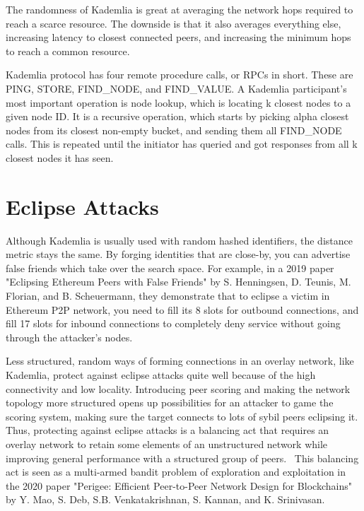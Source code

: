 The randomness of Kademlia is great at averaging the network hops required to reach a scarce resource. The downside is that it also averages everything else, increasing latency to closest connected peers, and increasing the minimum hops to reach a common resource.

Kademlia protocol has four remote procedure calls, or RPCs in short. These are PING, STORE, FIND\_NODE, and FIND\_VALUE. A Kademlia participant's most important operation is node lookup, which is locating k closest nodes to a given node ID. It is a recursive operation, which starts by picking alpha closest nodes from its closest non-empty bucket, and sending them all FIND\_NODE calls. This is repeated until the initiator has queried and got responses from all k closest nodes it has seen.

\section{Eclipse Attacks}
Although Kademlia is usually used with random hashed identifiers, the distance metric stays the same. By forging identities that are close-by, you can advertise false friends which take over the search space. For example, in a 2019 paper "Eclipsing Ethereum Peers with False Friends" by S. Henningsen, D. Teunis, M. Florian, and B. Scheuermann, they demonstrate that to eclipse a victim in Ethereum P2P network, you need to fill its 8 slots for outbound connections, and fill 17 slots for inbound connections to completely deny service without going through the attacker's nodes.~\cite{Henningsen2019-mf}

Less structured, random ways of forming connections in an overlay network, like Kademlia, protect against eclipse attacks quite well because of the high connectivity and low locality. Introducing peer scoring and making the network topology more structured opens up possibilities for an attacker to game the scoring system, making sure the target connects to lots of sybil peers eclipsing it. Thus, protecting against eclipse attacks is a balancing act that requires an overlay network to retain some elements of an unstructured network while improving general performance with a structured group of peers.~\cite{Mao2020-ee} This balancing act is seen as a multi-armed bandit problem of exploration and exploitation in the 2020 paper "Perigee: Efficient Peer-to-Peer Network Design for Blockchains" by Y. Mao, S. Deb, S.B. Venkatakrishnan, S. Kannan, and K. Srinivasan.


